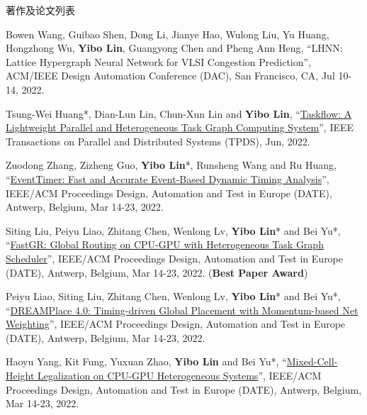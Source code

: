 \begin{rSection}{著作及论文列表}
\begin{description}[font=\normalfont, rightmargin=2em]
{}
            

\item[{[C92]}]{
        Bowen Wang, Guibao Shen, Dong Li, Jianye Hao, Wulong Liu, Yu Huang, Hongzhong Wu, \textbf{Yibo Lin}, Guangyong Chen and Pheng Ann Heng, 
    ``LHNN: Lattice Hypergraph Neural Network for VLSI Congestion Prediction'', 
    ACM/IEEE Design Automation Conference (DAC), San Francisco, CA, Jul 10-14, 2022.
    
}
            

\item[{[J91]}]{
        Tsung-Wei Huang*, Dian-Lun Lin, Chun-Xun Lin and \textbf{Yibo Lin}, 
    ``\href{https://doi.org/10.1109/TPDS.2021.3104255}{Taskflow: A Lightweight Parallel and Heterogeneous Task Graph Computing System}'', 
    IEEE Transactions on Parallel and Distributed Systems (TPDS), Jun, 2022.
    
}
            

\item[{[C90]}]{
        Zuodong Zhang, Zizheng Guo, \textbf{Yibo Lin}*, Runsheng Wang and Ru Huang, 
    ``\href{https://doi.org/10.23919/DATE54114.2022.9774642}{EventTimer: Fast and Accurate Event-Based Dynamic Timing Analysis}'', 
    IEEE/ACM Proceedings Design, Automation and Test in Europe (DATE), Antwerp, Belgium, Mar 14-23, 2022.
    
}
            

\item[{[C89]}]{
        Siting Liu, Peiyu Liao, Zhitang Chen, Wenlong Lv, \textbf{Yibo Lin}* and Bei Yu*, 
    ``\href{https://doi.org/10.23919/DATE54114.2022.9774606}{FastGR: Global Routing on CPU-GPU with Heterogeneous Task Graph Scheduler}'', 
    IEEE/ACM Proceedings Design, Automation and Test in Europe (DATE), Antwerp, Belgium, Mar 14-23, 2022.
    (\textbf{Best Paper Award})
}
            

\item[{[C88]}]{
        Peiyu Liao, Siting Liu, Zhitang Chen, Wenlong Lv, \textbf{Yibo Lin}* and Bei Yu*, 
    ``\href{https://doi.org/10.23919/DATE54114.2022.9774725}{DREAMPlace 4.0: Timing-driven Global Placement with Momentum-based Net Weighting}'', 
    IEEE/ACM Proceedings Design, Automation and Test in Europe (DATE), Antwerp, Belgium, Mar 14-23, 2022.
    
}
            

\item[{[C87]}]{
        Haoyu Yang, Kit Fung, Yuxuan Zhao, \textbf{Yibo Lin} and Bei Yu*, 
    ``\href{https://doi.org/10.23919/DATE54114.2022.9774671}{Mixed-Cell-Height Legalization on CPU-GPU Heterogeneous Systems}'', 
    IEEE/ACM Proceedings Design, Automation and Test in Europe (DATE), Antwerp, Belgium, Mar 14-23, 2022.
    
}
\end{description}
\end{rSection}
